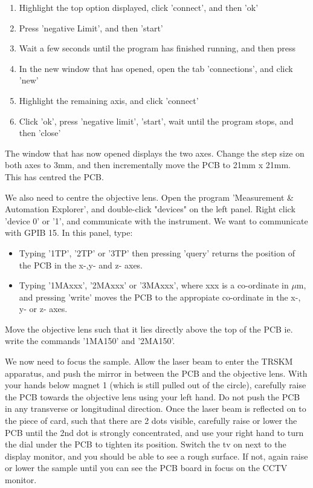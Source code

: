 \documentclass[14pt,a4paper] {article}
\begin{document}
\begin{enumerate}
\item Highlight the top option displayed, click 'connect', and then 'ok'
\item Press 'negative Limit', and then 'start'
\item Wait a few seconds until the program has finished running, and then press %
\item In the new window that has opened, open the tab 'connections', and click 'new'
\item Highlight the remaining axis, and click 'connect'
\item Click 'ok', press 'negative limit', 'start', wait until the program stops, and then 'close'
\end{enumerate}

The window that has now opened displays the two axes. Change the step size on both axes to 3mm, and then incrementally move the PCB to 21mm x 21mm. This has centred the PCB.

We also need to centre the objective lens. Open the program 'Measurement \& Automation Explorer', and double-click "devices" on the left panel. Right click 'device 0' or '1', and communicate with the instrument. We want to communicate with GPIB 15. In this panel, type:

\begin{itemize}
\item Typing '1TP', '2TP' or '3TP' then pressing 'query' returns the position of the PCB in the x-,y- and z- axes.
\item Typing '1MAxxx', '2MAxxx' or '3MAxxx', where xxx is a co-ordinate in $\mu$m, and pressing 'write' moves the PCB to the appropiate co-ordinate in the x-, y- or z- axes.
\end{itemize}

Move the objective lens such that it lies directly above the top of the PCB ie. write the commands '1MA150' and '2MA150'.

We now need to focus the sample. Allow the laser beam to enter the TRSKM apparatus, and push the mirror in between the PCB and the objective lens. With your hands below magnet 1 (which is still pulled out of the circle), carefully raise the PCB towards the objective lens using your left hand. Do not push the PCB in any transverse or longitudinal direction. Once the laser beam is reflected on to the piece of card, such that there are 2 dots visible, carefully raise or lower the PCB until the 2nd dot is strongly concentrated, and use your right hand to turn the dial under the PCB to tighten its position. Switch the tv on next to the display monitor, and you should be able to see a rough surface. If not, again raise or lower the sample until you can see the PCB board in focus on the CCTV monitor.
\end{document}
